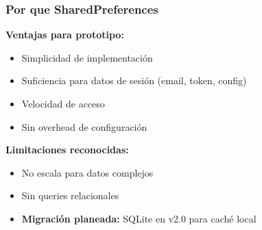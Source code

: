 \subsubsection{Por que SharedPreferences}

\textbf{Ventajas para prototipo:}
\begin{itemize}
    \item Simplicidad de implementación
    \item Suficiencia para datos de sesión (email, token, config)
    \item Velocidad de acceso
    \item Sin overhead de configuración
\end{itemize}

\textbf{Limitaciones reconocidas:}
\begin{itemize}
    \item No escala para datos complejos
    \item Sin queries relacionales
    \item \textbf{Migración planeada:} SQLite en v2.0 para caché local
\end{itemize}
